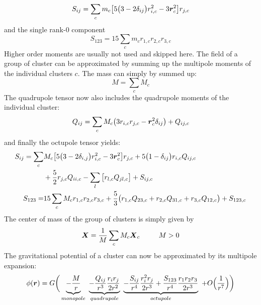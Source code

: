 \begin{equation}
\label{ch02_grav02_eq004}
S_{ij}  = \sum_{c} m_c \big[ 5 \big( 3 - 2  \delta_{i j} \big) r_{i, c}^2 - 3 \boldsymbol{r}_{c}^2 \big] r_{j, c}\\
\end{equation}
and the single rank-0 component
\begin{equation}
\label{ch02_grav02_eq005}
S_{1 2 3} = 15 \sum_{c} m_c r_{1, c} r_{2, c} r_{3, c}
\end{equation}
Higher order moments are usually not used and skipped here. The field of a group of cluster can be approximated by summing up the multipole moments of the individual clusters $c$. The mass can simply by summed up:
\begin{equation}
\label{ch02_grav02_eq006}
M = \sum_{c} M_{c}
\end{equation}
The quadrupole tensor now also includes the quadrupole moments of the individual cluster:
\begin{equation}
\label{ch02_grav02_eq007}
Q_{ij} = \sum_{c} M_{c} \big( 3 r_{i, c} r_{j, c} - \boldsymbol{r}_{c}^{2} \delta_{i j} \big) + Q_{i j, c} 
\end{equation}
and finally the octupole tensor yields:
\begin{align}
\label{ch02_grav02_eq008}
S_{ij} = \sum_{c}&  M_{c} \big[ 5 \big( 3 - 2 \delta_{i,j} \big) r_{i, c}^{2} - 3 \boldsymbol{r}_{c}^2 \big] r_{j, c} 
+ 5 \big( 1 - \delta_{i j} \big) r_{i, c} Q_{i j, c} \nonumber \\
&+ \frac{5}{2} r_{j, c} Q_{i i, c} - \sum_{l} \big[ r_{l, c} Q_{j l, c} \big] + S_{i j, c} \\
S_{1 2 3} =& 15 \sum_{c} M_{c} r_{1, c} r_{2, c} r_{3, c} + \frac{5}{3} \big( r_{1, c} Q_{2 3, c} + r_{2, c} Q_{3 1, c} + r_{3, c} Q_{1 2, c} \big) + S_{1 2 3, c }
\end{align}
The center of mass of the group of clusters is simply given by 
\begin{equation}
\label{ch02_grav02_eq009}
\boldsymbol{X} = \frac{1}{M} \sum_{c} M_{c} \boldsymbol{X}_{c} ~~~~~~~~  M > 0
\end{equation}
The gravitational potential of a cluster can now be approximated by its multipole expansion:
\begin{equation}
\label{ch02_grav02_eq010}
\phi(\boldsymbol{r}) = G \bigg(
\underbrace{ - \frac{M}{r} }_{monopole} ~ 
\underbrace{ - \frac{Q_{i j}}{r^{3}} \frac{r_{i} r_{j} }{2 r^{2} } }_{quadrupole}~ 
\underbrace{ - \frac{S_{i j}}{r^{4}} \frac{r_{i}^2 r_{j}}{2 r^{3} } + \frac{ S_{1 2 3} }{r^{4}}\frac{ r_{1} r_{2} r_{3} }{2 r^{3}} }_{octupole}~ 
+ O\Big(\frac{1}{r^{7}}\Big) \bigg)
\end{equation}
